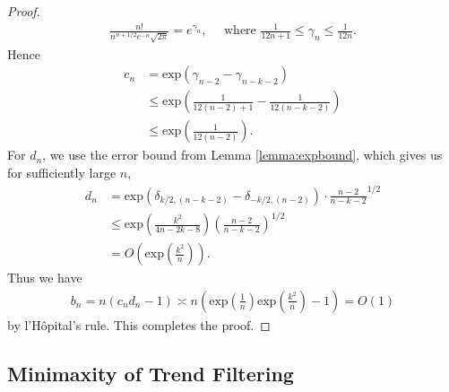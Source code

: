 \documentclass[a4paper]{article}
\begin{document}
\begin{proof}
\begin{align*}
\frac{n!}{n^{n+1/2}e^{-n}\sqrt{2\pi}} = e^{\gamma_n}, \quad \text{ where } \frac{1}{12n+1}\leq \gamma_n \leq \frac{1}{12n}.
\end{align*}
Hence 
\begin{align*}
c_n &= \mbox{exp}(\gamma_{n-2} - \gamma_{n-k-2})\\ 
&\leq \mbox{exp}(\frac{1}{12(n-2)+1} - \frac{1}{12(n-k-2)})\\
&\leq \mbox{exp}(\frac{1}{12(n-2)}).
\end{align*}
For $d_n$, we use the error bound from Lemma \ref{lemma:expbound}, which gives us for sufficiently large $n$,
\begin{align*}
d_n &= \mbox{exp}(\delta_{k/2, (n-k-2)} - \delta_{-k/2, (n-2)})\cdot\frac{n-2}{n-k-2}^{1/2}\\
&\leq \mbox{exp}(\frac{k^2}{4n-2k-8})(\frac{n-2}{n-k-2})^{1/2}\\
&= O(\mbox{exp}(\frac{k^2}{n})).
\end{align*}
Thus we have
\begin{align*}
b_n = n(c_nd_n - 1) \asymp n(\mbox{exp}(\frac{1}{n})\mbox{exp}(\frac{k^2}{n}) - 1) = O(1)
\end{align*}
by l'H\^opital's rule. This completes the proof.
\end{proof}

\subsection{Minimaxity of Trend Filtering}
\end{document}
